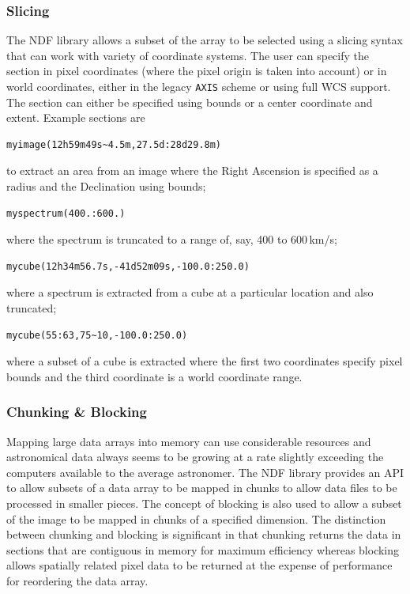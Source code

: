 \documentclass[final,authoryear,5p,times,twocolumn]{elsarticle}
\begin{document}
\subsubsection{Slicing}

The NDF library allows a subset of the array to be selected using a
slicing syntax that can work with variety of coordinate systems. The
user can specify the section in pixel coordinates (where the pixel
origin is taken into account) or in world coordinates, either in the
legacy \texttt{AXIS} scheme or using full WCS support. The section can
either be specified using bounds or a center coordinate and
extent. Example sections are
\begin{verbatim}
myimage(12h59m49s~4.5m,27.5d:28d29.8m)
\end{verbatim}
to extract an area from an image where the Right Ascension is
specified as a radius and the Declination using bounds;
\begin{verbatim}
myspectrum(400.:600.)
\end{verbatim}
where the spectrum is truncated to a range of, say, 400 to 600\,km/s;
\begin{verbatim}
mycube(12h34m56.7s,-41d52m09s,-100.0:250.0)
\end{verbatim}
where a spectrum is extracted from a cube at a particular location and
also truncated;
\begin{verbatim}
mycube(55:63,75~10,-100.0:250.0)
\end{verbatim}
where a subset of a cube is extracted where the first two coordinates
specify pixel bounds and the third coordinate is a world coordinate range.

\subsubsection{Chunking \& Blocking}

Mapping large data arrays into memory can use considerable resources
and astronomical data always seems to be growing at a rate slightly
exceeding the computers available to the average astronomer. The NDF
library provides an API to allow subsets of a data array to be mapped
in chunks to allow data files to be processed in smaller pieces. The
concept of blocking is also used to allow a subset of the image to be
mapped in chunks of a specified dimension. The distinction between
chunking and blocking is significant in that chunking returns the data
in sections that are contiguous in memory for maximum efficiency
whereas blocking allows spatially related pixel data to be returned at
the expense of performance for reordering the data array.
\end{document}
